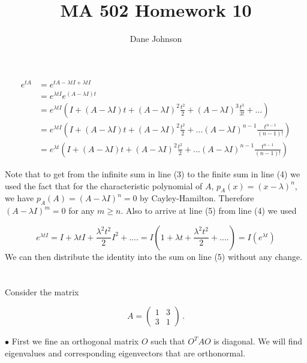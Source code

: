 \documentclass[11pt]{article}
\title{MA 502 Homework 10}
\author{Dane Johnson}
\begin{document}
\maketitle

\section{}


\begin{align}e^{tA} & = e^{tA - \lambda t I + \lambda t I} \\ &= e^{\lambda t I}e^{(A-\lambda I)t}\\
&= e^{\lambda t I}\left(I + (A-\lambda I)t + (A-\lambda I)^2 \frac{t^2}{2} + (A-\lambda I)^3\frac{t^3}{3!} + ... \right)\\
&= e^{\lambda t I }\left(I + (A-\lambda I)t + (A-\lambda I)^2 \frac{t^2}{2} + ... (A-\lambda I)^{n-1} \frac{t^{n-1}}{(n-1)!}\right)\\ &= e^{\lambda t }\left(I + (A-\lambda I)t + (A-\lambda I)^2 \frac{t^2}{2} + ... (A-\lambda I)^{n-1} \frac{t^{n-1}}{(n-1)!}\right)
\end{align}

Note that to get from the infinite sum in line (3) to the finite sum in line (4) we used the fact that for the characteristic polynomial of $A$, $p_A(x) = (x-\lambda)^n$, we have $p_A(A) = (A-\lambda I)^n = 0$ by Cayley-Hamilton. Therefore $(A-\lambda I)^m = 0$ for any $m \geq n$. Also to arrive at line (5) from line (4) we used

$$e^{\lambda t I} = I + \lambda t I +  \frac{\lambda^2 t^2}{2} I^2 + .... = I(1 + \lambda t + \frac{\lambda^2 t^2}{2} + ....) = I(e^{\lambda t})$$ We can then distribute the identity into the sum on line (5) without any change. 



\section{}

Consider the matrix

$$A = \begin{pmatrix}
1 & 3 \\ 3 & 1
\end{pmatrix} \,.$$

$\bullet$ First we fine an orthogonal matrix $O$ such that $O^TAO$ is diagonal. We will find eigenvalues and corresponding eigenvectors that are orthonormal.\\
\end{document}
